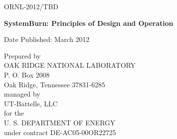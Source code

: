 \documentclass[11pt]{article}
\begin{document}
\newpage

\begin{titlepage}

\begin{flushright}ORNL-2012/TBD
\end{flushright}

\vspace{1.25in}

\begin{center}
{\bf{
SystemBurn: Principles of Design and Operation
}}
\vspace{0.5in}

\author{\\
Jeffery A. Kuehn, Stephen W. Poole, Stephen W. Hodson, \\
Joshua K. Lothian, Jonathan D. Dobson, David B. Reister, \\
Nicholas R. Lewkow, S. Ross Glandon,  Jacob T. Peek, \\
Matthew B. Baker \\
\\
The Extreme Scale Systems Center \\
Computer Science and Mathematics Division \\
Oak Ridge National Laboratory \\
Oak Ridge, TN 37831 \\
http://www.csm.ornl.gov/essc\\
\\
\\
kuehn@ornl.gov, spoole@ornl.gov, hodsonsw@ornl.gov,\\
lothian@ornl.gov, dobsonjd@ornl.gov, dbr@ornl.gov, \\
lewkownr@ornl.gov, glandonsr@ornl.gov, peekjt@ornl.gov\\
}


\vspace{1in}

Date Published: March 2012

\vspace{1in}

Prepared by \\
OAK RIDGE NATIONAL LABORATORY \\
P. O. Box 2008 \\
Oak Ridge, Tennessee 37831-6285 \\
managed by \\
UT-Battelle, LLC \\
for the \\
U. S. DEPARTMENT OF ENERGY \\
under contract DE-AC05-00OR22725

\end{center}

\end{titlepage}
\end{document}
